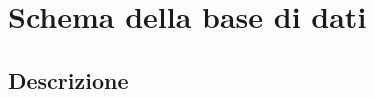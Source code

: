 \documentclass[../SpecificaTecnica.tex]{subfiles}
\begin{document}
\section{Schema della base di dati}
	\subsection{Descrizione}
		
\end{document}
